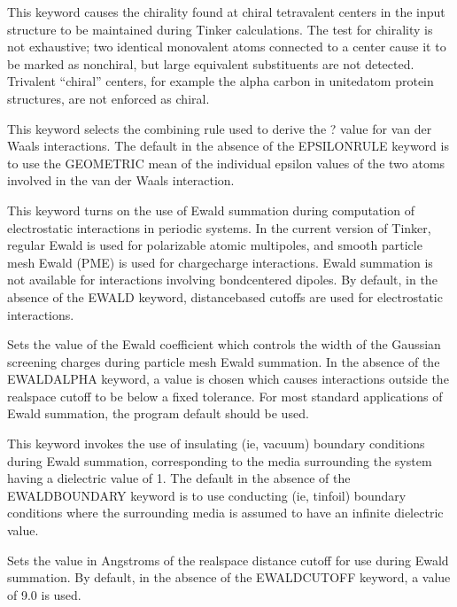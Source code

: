 \documentclass[letterpaper,11pt,english]{sphinxmanual}
\begin{document}

  This keyword causes the chirality found at chiral tetravalent centers in the input structure to be maintained during Tinker calculations. The test for chirality is not exhaustive; two identical monovalent atoms connected to a center cause it to be marked as non\sphinxhyphen{}chiral, but large equivalent substituents are not detected. Trivalent “chiral” centers, for example the alpha carbon in united\sphinxhyphen{}atom protein structures, are not enforced as chiral.

  This keyword selects the combining rule used to derive the ? value for van der Waals interactions. The default in the absence of the EPSILONRULE keyword is to use the GEOMETRIC mean of the individual epsilon values of the two atoms involved in the van der Waals interaction.

  This keyword turns on the use of Ewald summation during computation of electrostatic interactions in periodic systems. In the current version of Tinker, regular Ewald is used for polarizable atomic multipoles, and smooth particle mesh Ewald (PME) is used for charge\sphinxhyphen{}charge interactions. Ewald summation is not available for interactions involving bond\sphinxhyphen{}centered dipoles. By default, in the absence of the EWALD keyword, distance\sphinxhyphen{}based cutoffs are used for electrostatic interactions.

  Sets the value of the Ewald coefficient which controls the width of the Gaussian screening charges during particle mesh Ewald summation. In the absence of the EWALD\sphinxhyphen{}ALPHA keyword, a value is chosen which causes interactions outside the real\sphinxhyphen{}space cutoff to be below a fixed tolerance. For most standard applications of Ewald summation, the program default should be used.

  This keyword invokes the use of insulating (ie, vacuum) boundary conditions during Ewald summation, corresponding to the media surrounding the system having a dielectric value of 1. The default in the absence of the EWALD\sphinxhyphen{}BOUNDARY keyword is to use conducting (ie, tinfoil) boundary conditions where the surrounding media is assumed to have an infinite dielectric value.

  Sets the value in Angstroms of the real\sphinxhyphen{}space distance cutoff for use during Ewald summation. By default, in the absence of the EWALD\sphinxhyphen{}CUTOFF keyword, a value of 9.0 is used.
\end{document}

